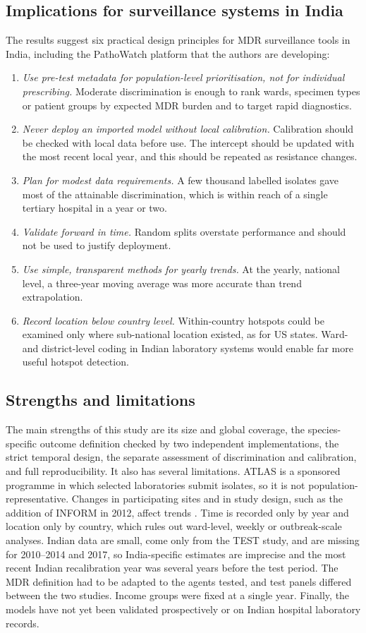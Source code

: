 \documentclass[11pt,a4paper]{article}
\begin{document}
\subsection{Implications for surveillance systems in India}
The results suggest six practical design principles for MDR surveillance tools in India, including the PathoWatch platform that the authors are developing:
\begin{enumerate}
\item \textit{Use pre-test metadata for population-level prioritisation, not for individual prescribing.} Moderate discrimination is enough to rank wards, specimen types or patient groups by expected MDR burden and to target rapid diagnostics.
\item \textit{Never deploy an imported model without local calibration.} Calibration should be checked with local data before use. The intercept should be updated with the most recent local year, and this should be repeated as resistance changes.
\item \textit{Plan for modest data requirements.} A few thousand labelled isolates gave most of the attainable discrimination, which is within reach of a single tertiary hospital in a year or two.
\item \textit{Validate forward in time.} Random splits overstate performance and should not be used to justify deployment.
\item \textit{Use simple, transparent methods for yearly trends.} At the yearly, national level, a three-year moving average was more accurate than trend extrapolation.
\item \textit{Record location below country level.} Within-country hotspots could be examined only where sub-national location existed, as for US states. Ward- and district-level coding in Indian laboratory systems would enable far more useful hotspot detection.
\end{enumerate}

\subsection{Strengths and limitations}
The main strengths of this study are its size and global coverage, the species-specific outcome definition checked by two independent implementations, the strict temporal design, the separate assessment of discrimination and calibration, and full reproducibility. It also has several limitations. ATLAS is a sponsored programme in which selected laboratories submit isolates, so it is not population-representative. Changes in participating sites and in study design, such as the addition of INFORM in 2012, affect trends \cite{catalan2022}. Time is recorded only by year and location only by country, which rules out ward-level, weekly or outbreak-scale analyses. Indian data are small, come only from the TEST study, and are missing for 2010--2014 and 2017, so India-specific estimates are imprecise and the most recent Indian recalibration year was several years before the test period. The MDR definition had to be adapted to the agents tested, and test panels differed between the two studies. Income groups were fixed at a single year. Finally, the models have not yet been validated prospectively or on Indian hospital laboratory records.
\end{document}
